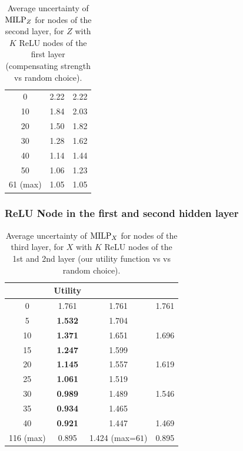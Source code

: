 \begin{table}[h!]
	\centering
	\begin{tabular}{|c||c|c|}
		\hline
		\text{Number $K$ of nodes in $Z$}  &  \text{Compensate strength} & \text{Random Choice}  \\ \hline
		\hline
		0  &  2.22 & 2.22  \\ \hline
		10  &  1.84 & 2.03  \\ \hline
		20  &  1.50 & 1.82  \\ \hline
		30  &  1.28 & 1.62  \\ \hline
		40  &  1.14 & 1.44  \\ \hline
		50  &  1.06 & 1.23  \\ \hline
		61 (max) & 1.05 &  1.05 \\ \hline
	\end{tabular}
	\caption{Average uncertainty of ${\textrm{MILP}}_Z$ for nodes of the second layer, for $Z$ with $K$ ReLU nodes of the first layer (compensating strength vs random choice).}
	\label{tab:example0}
\end{table}




\subsubsection*{ReLU Node in the first and second hidden layer}
\fi


\begin{table}[b!]	
	\centering
	\begin{tabular}{|c||c|c|c|}
		\hline
		\text{Number $K$}  &  \bf Utility&  \text{Strength} \cite{ DivideAndSlide} & \text{Random} \\ \hline
		\hline
		0  &   1.761  & 1.761 & 1.761  \\ \hline
		5  & \bf 1.532  & 1.704 &   \\ \hline
		10  & \bf 1.371  & 1.651 & 1.696  \\ \hline
		15  & \bf 1.247  &  1.599 &   \\ \hline
		20  & \bf 1.145  & 1.557 & 1.619  \\ \hline
		25  & \bf 1.061  & 1.519 &   \\ \hline
		30  & \bf 0.989  & 1.489 & 1.546  \\ \hline
		35  & \bf 0.934  & 1.465 &   \\ \hline
		40  & \bf 0.921 & 1.447 & 1.469  \\ \hline
		116 (max) &  0.895 & 1.424 (max=$61$) & 0.895  \\ \hline
	\end{tabular}
	\caption{Average uncertainty of ${\textrm{MILP}}_X$ for nodes of the third layer, for $X$ with $K$ ReLU nodes of the 1st and 2nd layer (our utility function vs \cite{ DivideAndSlide} vs random choice).}
	\label{tab:example1}
	\vspace{-0.6cm}
\end{table}



